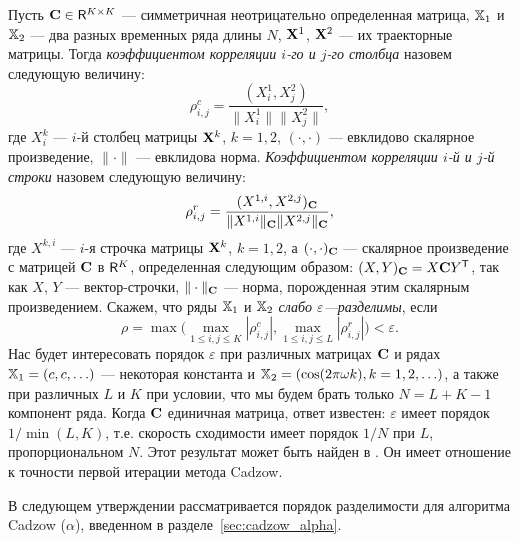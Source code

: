 \documentclass[12pt,a4paper,fleqn,leqno]{article}
\begin{document}
Пусть $\mathbf{C} \in \mathsf{R}^{K \times K}$ --- симметричная неотрицательно определенная матрица, $\mathbb{X}_1$ и $\mathbb{X}_2$ ---  два разных временных ряда длины $N$, $\mathbf{X}^1$, $\mathbf{X}^2$ --- их траекторные матрицы. Тогда \emph{коэффициентом корреляции $i$-го и $j$-го столбца} назовем следующую величину:
\begin{equation}\label{col_corr}
\rho^c_{i,j} = \frac{(X^1_i, X^2_j)}{\|X^1_i\| \|X^2_j\|},
\end{equation}
где $X^k_i$ --- $i$-й столбец матрицы $\mathbf{X}^k$, $k = 1, 2$, $(\cdot, \cdot)$ --- евклидово скалярное произведение, $\|\cdot\|$ --- евклидова норма. \emph{Коэффициентом корреляции $i$-й и $j$-й строки} назовем следующую величину:
\begin{equation}\label{row_corr}
\rho^r_{i,j} = \frac{(X^{1,i}, X^{2,j})_{\mathbf{C}}}{\|X^{1,i}\|_{\mathbf{C}} \|X^{2,j}\|_{\mathbf{C}}},
\end{equation}
где $X^{k,i}$ --- $i$-я строчка матрицы $\mathbf{X}^k$, $k = 1, 2$, а $(\cdot, \cdot)_{\mathbf{C}}$ --- скалярное произведение с матрицей $\mathbf{C}$ в $\mathsf{R}^K$, определенная следующим образом: $(X, Y)_{\mathbf{C}} = X \mathbf{C} Y^{\mathsf{T}}$, так как $X$, $Y$ --- вектор-строчки, $\| \cdot \|_{\mathbf{C}}$ --- норма, порожденная этим скалярным произведением. Скажем, что ряды $\mathbb{X}_1$ и $\mathbb{X}_2$ \emph{слабо $\varepsilon$---разделимы}, если
\begin{equation}\label{weak_sep_eq}
\rho = \max\Big(\max_{1 \le i,j \le K}|\rho^c_{i,j}|, \max_{1 \le i,j \le L}|\rho^r_{i,j}|\Big) < \varepsilon.
\end{equation}
Нас будет интересовать порядок $\varepsilon$ при различных матрицах $\mathbf{C}$ и рядах $\mathbb{X}_1 = (c, c, \ldots)$ --- некоторая константа и $\mathbb{X}_2 = (\cos(2 \pi \omega k), k = 1, 2, \ldots)$, а также при различных $L$ и $K$ при условии, что мы будем брать только $N = L + K - 1$ компонент ряда. Когда $\mathbf{C}$ единичная матрица, ответ известен: $\varepsilon$ имеет порядок $1/\min(L,K)$, т.е. скорость сходимости имеет порядок $1/N$ при $L$, пропорциональном $N$.
Этот результат может быть найден в \cite[Раздел 6.1]{Golyandina.etal2001}. Он имеет отношение к точности первой итерации метода Cadzow.

В следующем утверждении рассматривается порядок разделимости для алгоритма Cadzow ($\alpha$), введенном в разделе~\ref{sec:cadzow_alpha}.
\end{document}
